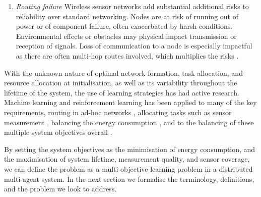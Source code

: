 \begin{enumerate}
\item \textit{Routing failure} Wireless sensor networks add substantial additional risks to reliability over standard networking. Nodes are at risk of running out of power or of component failure, often exacerbated by harsh conditions. Environmental effects or obstacles may physical impact transmission or reception of signals. Loss of communication to a node is especially impactful as there are often multi-hop routes involved, which multiplies the risks \citep{Paradis2007}.
\end{enumerate}

\ifdefined\DEBUG {} \else \fi
With the unknown nature of optimal network formation, task allocation, and resource allocation at initialisation, as well as its variability throughout the lifetime of the system, the use of learning strategies has had active research. Machine learning and reinforcement learning has been applied to many of the key requirements, routing in ad-hoc networks \citep{Nurmi}, allocating tasks such as sensor measurement \citep{doi:10.1155/2014/765182}, balancing the energy consumption \citep{10.1007/978-3-642-11814-2_4, PraveenKumar2019a}, and to the balancing of these multiple system objectives overall \citep{SENGUPTA2013405, s150717572}.

\ifdefined\DEBUG {} \else \fi
By setting the system objectives as the minimisation of energy consumption, and the maximisation of system lifetime, measurement quality, and sensor coverage, we can define the problem as a multi-objective learning problem in a distributed multi-agent system. In the next section we formalise the terminology, definitions, and the problem we look to address.


